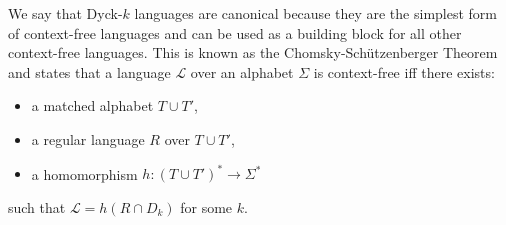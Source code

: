 We say that Dyck-$k$ languages are canonical because they are the simplest form of context-free languages and can be used as a building block 
for all other context-free languages. This is known as the Chomsky-Sch{\"u}tzenberger Theorem \cite{rozenberg1997handbook} and states that a language $\mathcal{L}$ over an alphabet $\Sigma$ is context-free iff there exists:
\begin{itemize}
    \item a matched alphabet $T \cup T'$,
    \item a regular language $R$ over $T \cup T'$,
    \item a homomorphism $h: {(T \cup T')}^* \rightarrow \Sigma^*$
\end{itemize}

such that $\mathcal{L} = h(R \cap D_k)$ for some $k$.